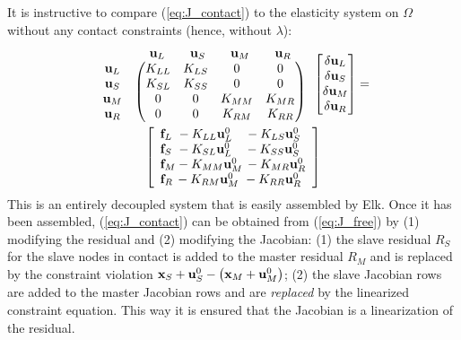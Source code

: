 \documentclass[11pt]{article}
\newcommand{\vecx}{{\bf x}}
\newcommand{\vecu}{{\bf u}}
\newcommand{\vecf}{{\bf f}}
\begin{document}
It is instructive to compare (\ref{eq:J_contact}) to the elasticity system on $\Omega$ without any contact constraints (hence, without $\lambda$):
\begin{multline}
\label{eq:J_free}
\begin{array}{lc}  &  \begin{array}{ccccc} \vecu_L \quad & \vecu_S \quad & \vecu_M \quad & \vecu_R \end{array}\\
\begin{matrix} \vecu_L\\ \vecu_S \\ \vecu_M \\ \vecu_R\end{matrix} &
\begin{pmatrix}
 K_{LL} & K_{LS} &   0   &  0 \\
 K_{SL} & K_{SS} &   0   &  0\\
 0     &   0    & K_{MM}& K_{MR}\\
 0     &   0    & K_{RM}& K_{RR}\\
\end{pmatrix}
\end{array}
\begin{bmatrix}
\delta \vecu_L\\ \delta \vecu_S \\ \delta \vecu_M \\ \delta \vecu_R
\end{bmatrix}
=\\
\left[\begin{array}{l}
\vecf_L \ - K_{LL} \vecu_L^0 \ \ \ - K_{LS} \vecu_S^0 \\
\vecf_S \ - K_{SL} \vecu_L^0 \ \ \ - K_{SS} \vecu_S^0\\
\vecf_M - K_{MM} \vecu_M^0 \, - K_{MR} \vecu_R^0\\
\vecf_R \, - K_{RM} \vecu_M^0 \ - K_{RR} \vecu_R^0
\end{array}\right]
\end{multline}
This is an entirely decoupled system that is easily assembled by Elk.  Once it has been assembled,
(\ref{eq:J_contact}) can be obtained from (\ref{eq:J_free}) by (1) modifying the residual and (2) modifying the Jacobian:
(1) the slave residual $R_S$ for the slave nodes in contact is added to the master residual $R_M$ and is replaced by the constraint violation $\vecx_S+\vecu_S^0-\left(\vecx_M+\vecu_M^0\right)$;
(2) the slave Jacobian rows are added to the master Jacobian rows and are \emph{replaced} by the linearized constraint equation.
This way it is ensured that the Jacobian is a linearization of the residual.
\end{document}
